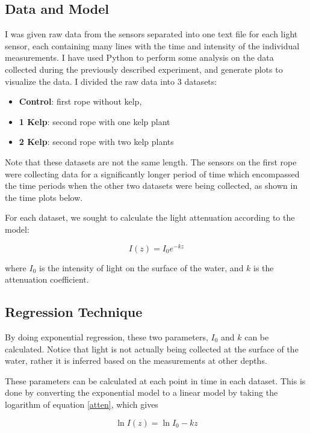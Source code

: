 \documentclass{article}
\begin{document}
\subsection{Data and Model}
I was given raw data from the sensors separated into one text file for each light sensor, each containing many lines with the time and intensity of the individual measurements. I have used Python to perform some analysis on the data collected during the previously described experiment, and generate plots to visualize the data. I divided the raw data into 3 datasets:
\begin{itemize}
	\item \textbf{Control}: first rope without kelp,
	\item \textbf{1 Kelp}: second rope with one kelp plant
	\item \textbf{2 Kelp}: second rope with two kelp plants
\end{itemize}

Note that these datasets are not the same length. The sensors on the first rope were collecting data for a significantly longer period of time which encompassed the time periods when the other two datasets were being collected, as shown in the time plots below.

For each dataset, we sought to calculate the light attenuation according to the model:

\begin{equation}
	I(z) = I_0e^{-kz}
	\label{atten}
\end{equation}

where $I_0$ is the intensity of light on the surface of the water, and $k$ is the attenuation coefficient.

\pagebreak
\subsection{Regression Technique}
By doing exponential regression, these two parameters, $I_0$ and $k$ can be calculated. Notice that light is not actually being collected at the surface of the water, rather it is inferred based on the measurements at other depths.

These parameters can be calculated at each point in time in each dataset. This is done by converting the exponential model to a linear model by taking the logarithm of equation \ref{atten}, which gives

\begin{equation}
	\ln I(z) = \ln I_0 - kz
	\label{log_atten}
\end{equation}
\end{document}
